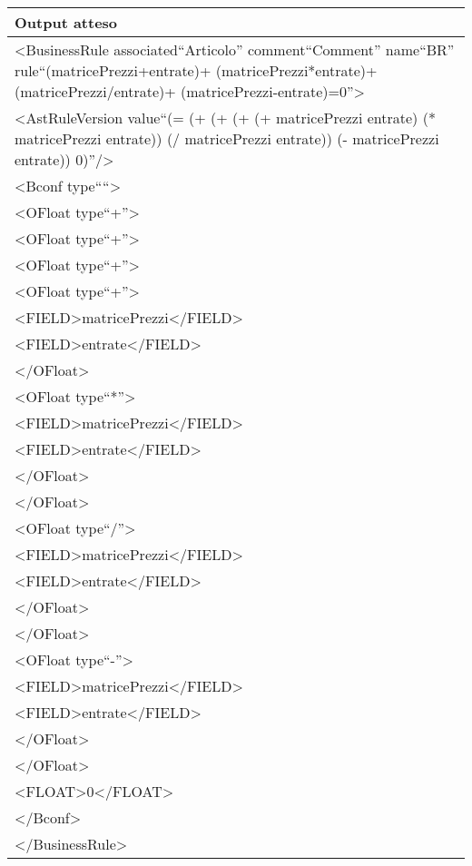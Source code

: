 \begin{center}
\begin{tabular}{|p{11cm}|} \hline
\textbf{Output atteso}\\ \hline
\textless BusinessRule associated``Articolo'' comment``Comment'' name``BR'' rule``(matricePrezzi+entrate)+ (matricePrezzi*entrate)+ (matricePrezzi/entrate)+ (matricePrezzi-entrate)=0''\textgreater\\
\textless AstRuleVersion value``(= (+ (+ (+ (+ matricePrezzi entrate) (* matricePrezzi entrate)) (/ matricePrezzi entrate)) (- matricePrezzi entrate)) 0)''/\textgreater\\
\textless Bconf type````\textgreater\\
\textless OFloat type``+''\textgreater\\
\textless OFloat type``+''\textgreater\\
\textless OFloat type``+''\textgreater\\
\textless OFloat type``+''\textgreater\\
\textless FIELD\textgreater matricePrezzi\textless /FIELD\textgreater\\
\textless FIELD\textgreater entrate\textless /FIELD\textgreater\\
\textless /OFloat\textgreater\\
\textless OFloat type``*''\textgreater\\
\textless FIELD\textgreater matricePrezzi\textless /FIELD\textgreater\\
\textless FIELD\textgreater entrate\textless /FIELD\textgreater\\
\textless /OFloat\textgreater\\
\textless /OFloat\textgreater\\
\textless OFloat type``/''\textgreater\\
\textless FIELD\textgreater matricePrezzi\textless /FIELD\textgreater\\
\textless FIELD\textgreater entrate\textless /FIELD\textgreater\\
\textless /OFloat\textgreater\\
\textless /OFloat\textgreater\\
\textless OFloat type``-''\textgreater\\
\textless FIELD\textgreater matricePrezzi\textless /FIELD\textgreater\\
\textless FIELD\textgreater entrate\textless /FIELD\textgreater\\
\textless /OFloat\textgreater\\
\textless /OFloat\textgreater\\
\textless FLOAT\textgreater0\textless /FLOAT\textgreater\\
\textless /Bconf\textgreater\\
\textless /BusinessRule\textgreater\\
 \hline
\end{tabular} \\
\end{center}

